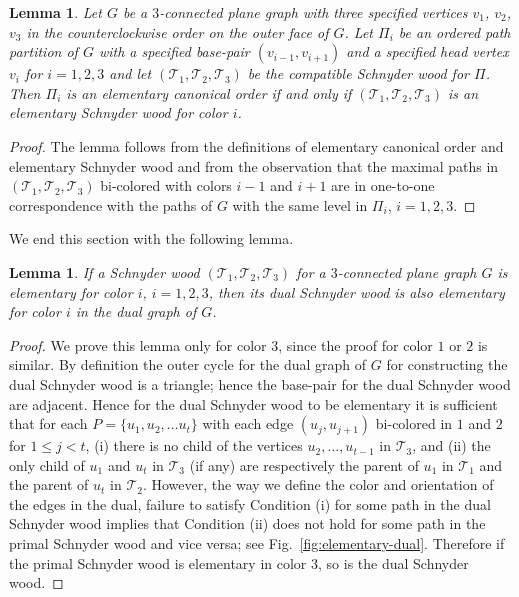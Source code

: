 \documentclass{article}
\newtheorem{lemma}[theorem]{Lemma}
\newcommand{\TT}{{\mathcal{T}}}
\begin{document}
\begin{lemma}
\label{lem:elementary}
 Let $G$ be a $3$-connected plane graph with three specified vertices $v_1$, $v_2$, $v_3$ in the
 counterclockwise order on the outer face of $G$. Let $\Pi_i$ be an ordered path partition of $G$
 with a specified base-pair $(v_{i-1},v_{i+1})$ and a specified head vertex $v_i$ for $i=1,2,3$ and let
 $(\TT_1, \TT_2, \TT_3)$ be the compatible Schnyder wood for $\Pi$. Then
 $\Pi_i$ is an elementary canonical order if and only if $(\TT_1, \TT_2, \TT_3)$ is an elementary
 Schnyder wood for color $i$.
\end{lemma}
\begin{proof} The lemma follows from the definitions of elementary canonical order and elementary
 Schnyder wood and from the observation that the maximal paths in $(\TT_1, \TT_2, \TT_3)$
 bi-colored with colors $i-1$ and $i+1$ are in one-to-one correspondence with the paths of $G$ with
 the same level in $\Pi_i$, $i=1,2,3$.

\end{proof}



We end this section with the following lemma.


\begin{lemma}
\label{lem:dual} If a Schnyder wood $(\TT_1, \TT_2, \TT_3)$ for a $3$-connected plane graph $G$ is
 elementary for color $i$, $i=1,2,3$, then its dual Schnyder wood is also elementary for color $i$
 in the dual graph of $G$.
\end{lemma}
\begin{proof} We prove this lemma only for color $3$, since the proof for color $1$ or $2$ is similar.
By definition the outer cycle for the dual graph of $G$ for constructing the dual Schnyder
 wood is a triangle; hence the base-pair for the dual Schnyder wood are adjacent. Hence for the dual
 Schnyder wood to be elementary it is sufficient that for each $P=\{u_1, u_2, \ldots u_t\}$
 with each edge $(u_j, u_{j+1})$ bi-colored in $1$ and $2$ for $1\le j<t$, (i) there is no child of the vertices
 $u_2, \ldots, u_{t-1}$ in $\TT_3$, and (ii) the only child of $u_1$ and $u_t$ in $\TT_3$ (if any) are
 respectively the parent of $u_1$ in $\TT_1$ and the parent of $u_t$ in $\TT_2$. However, the way
 we define the color and orientation of the edges in the dual, failure to satisfy Condition (i) for some
 path in the dual Schnyder wood implies that Condition (ii) does not hold for some path in the primal
 Schnyder wood and vice versa; see Fig.~\ref{fig:elementary-dual}. Therefore if the primal Schnyder
 wood is elementary in color 3, so is the dual Schnyder wood.
\end{proof}
\end{document}
